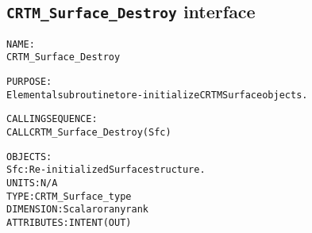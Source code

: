 \subsection{\texttt{CRTM\_Surface\_Destroy} interface}
  \label{sec:CRTM_Surface_Destroy_interface}
  \begin{alltt}
 
  NAME:
        CRTM_Surface_Destroy
 
  PURPOSE:
        Elemental subroutine to re-initialize CRTM Surface objects.
 
  CALLING SEQUENCE:
        CALL CRTM_Surface_Destroy( Sfc )
 
  OBJECTS:
        Sfc:          Re-initialized Surface structure.
                      UNITS:      N/A
                      TYPE:       CRTM_Surface_type
                      DIMENSION:  Scalar or any rank
                      ATTRIBUTES: INTENT(OUT)
 
  \end{alltt}
